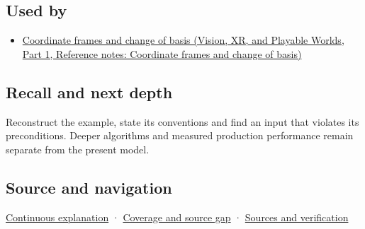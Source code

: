 \subsection{Used by}\label{appendix-48d2e66378ab-used-by}

\hypertarget{appendix-48d2e66378ab-used-by}{}

\begin{itemize}
\tightlist
\item
  \href{../07-Vision-XR-and-Playable-Worlds-P01/main.pdf\#appendix-1bae9457dbc3}{Coordinate frames and change of basis (Vision, XR, and Playable Worlds, Part 1, Reference notes: Coordinate frames and change of basis)}
\end{itemize}

\subsection{Recall and next depth}\label{appendix-48d2e66378ab-recall-and-next-depth}

\hypertarget{appendix-48d2e66378ab-recall-and-next-depth}{}

Reconstruct the example, state its conventions and find an input that violates its preconditions. Deeper algorithms and measured production performance remain separate from the present model.

\subsection{Source and navigation}\label{appendix-48d2e66378ab-source-and-navigation}

\hypertarget{appendix-48d2e66378ab-source-and-navigation}{}

\hyperref[01-foundations-i-ch018-keep-the-promises-visible-while-moving-between-representations]{Continuous explanation} · \hyperref[appendix-fd090d982a15-phase-7---parts-601-700]{Coverage and source gap} · \hyperref[appendix-a103e7846d21-phase-7---source-analysis-and-verification]{Sources and verification}
